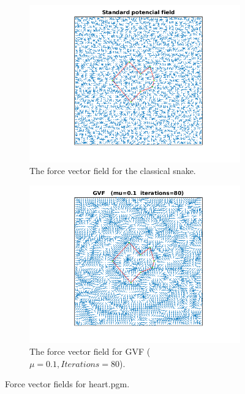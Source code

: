 \documentclass{article}
\begin{document}
\begin{figure}[H]
\centering
\begin{subfigure}{0.49\textwidth}
  \centering
  \includegraphics[width=\linewidth]{fig7a.png}
  \caption{The force vector field for the classical snake.}
  \label{fig7a}
\end{subfigure}
\begin{subfigure}{0.49\textwidth}
  \centering
  \includegraphics[width=\linewidth]{fig7b.png}
  \caption{The force vector field for GVF ($\mu = 0.1, Iterations=80$).}
  \label{fig7b}
\end{subfigure}
\caption{Force vector fields for heart.pgm.}
\end{figure}
\end{document}

